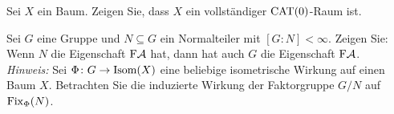 	\begin{aufgabe}
		\label{aufg:7.3}
		Sei $X$ ein Baum.
		Zeigen Sie, dass $X$ ein vollständiger $\operatorname{CAT(0)}$-Raum ist.
	\end{aufgabe}
	
	\begin{aufgabe}
		\label{aufg:7.4}
		Sei $G$ eine Gruppe und $N \subseteq G$ ein Normalteiler mit $[G : N] < \infty$.
		Zeigen Sie:
		Wenn $N$ die Eigenschaft $\text{F}\mathcal{A}$ hat, dann hat auch $G$ die Eigenschaft $\text{F}\mathcal{A}$. \\
		\textit{Hinweis:} Sei $\Phi\colon G \rightarrow \operatorname{Isom}(X)$ eine beliebige isometrische Wirkung auf einen Baum $X$.
		Betrachten Sie die induzierte Wirkung der Faktorgruppe $G/N$ auf $\operatorname{Fix}_\Phi(N)$.
	\end{aufgabe}